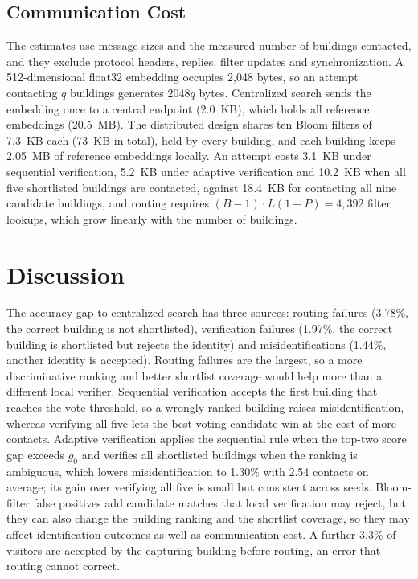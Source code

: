\documentclass[pdflatex,sn-mathphys-num]{sn-jnl}%
\theoremstyle{thmstyleone}%
\theoremstyle{thmstyletwo}%
\theoremstyle{thmstylethree}%
\begin{document}
\subsection{Communication Cost}
\label{sec:cost}

The estimates use message sizes and the measured number of buildings contacted, and they exclude protocol headers, replies, filter updates and synchronization. A 512-dimensional float32 embedding occupies 2,048 bytes, so an attempt contacting $q$ buildings generates $2048q$ bytes. Centralized search sends the embedding once to a central endpoint (2.0~KB), which holds all reference embeddings (20.5~MB). The distributed design shares ten Bloom filters of 7.3~KB each (73~KB in total), held by every building, and each building keeps 2.05~MB of reference embeddings locally. An attempt costs 3.1~KB under sequential verification, 5.2~KB under adaptive verification and 10.2~KB when all five shortlisted buildings are contacted, against 18.4~KB for contacting all nine candidate buildings, and routing requires $(B-1)\cdot L(1+P)=4{,}392$ filter lookups, which grow linearly with the number of buildings.


\section{Discussion}
\label{sec:discussion}

The accuracy gap to centralized search has three sources: routing failures (3.78\%, the correct building is not shortlisted), verification failures (1.97\%, the correct building is shortlisted but rejects the identity) and misidentifications (1.44\%, another identity is accepted). Routing failures are the largest, so a more discriminative ranking and better shortlist coverage would help more than a different local verifier. Sequential verification accepts the first building that reaches the vote threshold, so a wrongly ranked building raises misidentification, whereas verifying all five lets the best-voting candidate win at the cost of more contacts. Adaptive verification applies the sequential rule when the top-two score gap exceeds $g_0$ and verifies all shortlisted buildings when the ranking is ambiguous, which lowers misidentification to 1.30\% with 2.54 contacts on average; its gain over verifying all five is small but consistent across seeds. Bloom-filter false positives add candidate matches that local verification may reject, but they can also change the building ranking and the shortlist coverage, so they may affect identification outcomes as well as communication cost. A further 3.3\% of visitors are accepted by the capturing building before routing, an error that routing cannot correct.
\end{document}
